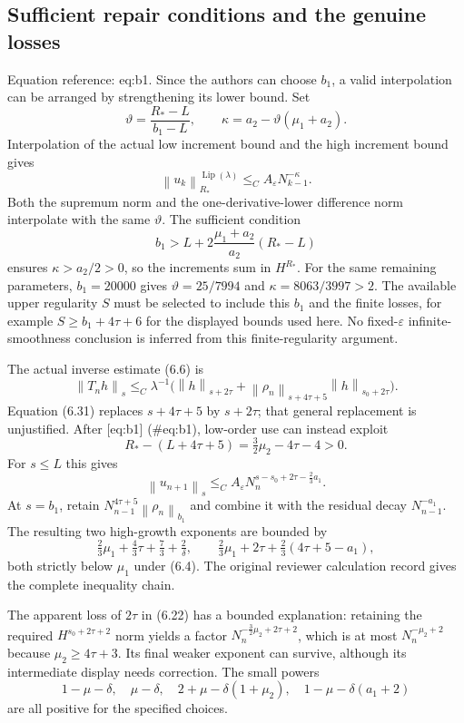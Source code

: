 \documentclass[10pt]{article}
\begin{document}
\subsection*{Sufficient repair conditions and the genuine losses}
Equation reference: eq:b1. Since the authors can choose \(b_1\), a valid interpolation can be arranged by strengthening its lower bound. Set \[\vartheta=\frac{R_*-L}{b_1-L},\qquad
 \kappa=a_2-\vartheta(\mu_1+a_2).\] Interpolation of the actual low increment bound and the high increment bound gives \[\left\lVert u_k\right\rVert_{R_*}^{\operatorname{Lip}(\lambda)}
       \mathrel{\leq_C}A_\varepsilon N_{k-1}^{-\kappa}.\] Both the supremum norm and the one-derivative-lower difference norm interpolate with the same \(\vartheta\). The sufficient condition \[
 b_1>L+2\frac{\mu_1+a_2}{a_2}(R_*-L)\] ensures \(\kappa>a_2/2>0\), so the increments sum in \(H^{R_*}\). For the same remaining parameters, \(b_1=20000\) gives \(\vartheta=25/7994\) and \(\kappa=8063/3997>2\). The available upper regularity \(S\) must be selected to include this \(b_1\) and the finite losses, for example \(S\ge b_1+4\tau+6\) for the displayed bounds used here. No fixed-\(\varepsilon\) infinite-smoothness conclusion is inferred from this finite-regularity argument.\par
The actual inverse estimate (6.6) is \[\left\lVert T_nh\right\rVert_s\mathrel{\leq_C}\lambda^{-1}
 \bigl(\left\lVert h\right\rVert_{s+2\tau}
       +\left\lVert \rho_n\right\rVert_{s+4\tau+5}\left\lVert h\right\rVert_{s_0+2\tau}\bigr).\] Equation (6.31) replaces \(s+4\tau+5\) by \(s+2\tau\); that general replacement is unjustified. After [eq:b1] (\#eq:b1), low-order use can instead exploit \[R_*-(L+4\tau+5)=\tfrac32\mu_2-4\tau-4>0.\] For \(s\le L\) this gives \[\left\lVert u_{n+1}\right\rVert_s
   \mathrel{\leq_C}A_\varepsilon
          N_n^{s-s_0+2\tau-\frac23a_1}.\] At \(s=b_1\), retain \(N_{n-1}^{4\tau+5}\left\lVert \rho_n\right\rVert_{b_1}\) and combine it with the residual decay \(N_{n-1}^{-a_1}\). The resulting two high-growth exponents are bounded by \[\tfrac23\mu_1+\tfrac43\tau+\tfrac73+\tfrac2\delta,
 \qquad
 \tfrac23\mu_1+2\tau+\tfrac23(4\tau+5-a_1),\] both strictly below \(\mu_1\) under (6.4). The original reviewer calculation record gives the complete inequality chain.\par
The apparent loss of \(2\tau\) in (6.22) has a bounded explanation: retaining the required \(H^{s_0+2\tau+2}\) norm yields a factor \(N_n^{-\frac32\mu_2+2\tau+2}\), which is at most \(N_n^{-\mu_2+2}\) because \(\mu_2\ge4\tau+3\). Its final weaker exponent can survive, although its intermediate display needs correction. The small powers \[1-\mu-\delta,\quad \mu-\delta,\quad
 2+\mu-\delta(1+\mu_2),\quad
 1-\mu-\delta(a_1+2)\] are all positive for the specified choices.\par
\end{document}
